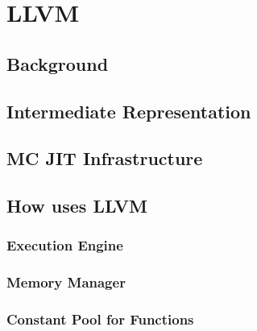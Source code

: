 \chapter{LLVM}

\section{Background}

\section{Intermediate Representation}

\section{MC JIT Infrastructure}

\section{How \rift uses LLVM}
\subsection{Execution Engine}
\subsection{Memory Manager}
\subsection{Constant Pool for Functions}
